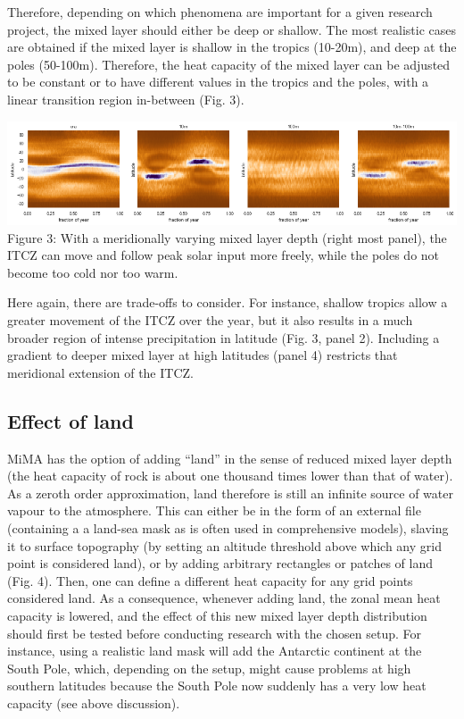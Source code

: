 Therefore, depending on which phenomena are important for a given
research project, the mixed layer should either be deep or shallow. The
most realistic cases are obtained if the mixed layer is shallow in the
tropics (10-20m), and deep at the poles (50-100m). Therefore, the heat
capacity of the mixed layer can be adjusted to be constant or to have
different values in the tropics and the poles, with a linear transition
region in-between (Fig. 3).

\includegraphics{itcz.png}\\
Figure 3: With a meridionally varying mixed layer depth (right most
panel), the ITCZ can move and follow peak solar input more freely, while
the poles do not become too cold nor too warm.

Here again, there are trade-offs to consider. For instance, shallow
tropics allow a greater movement of the ITCZ over the year, but it also
results in a much broader region of intense precipitation in latitude
(Fig. 3, panel 2). Including a gradient to deeper mixed layer at high
latitudes (panel 4) restricts that meridional extension of the ITCZ.

\subsection{Effect of land}\label{effect-of-land}

MiMA has the option of adding ``land'' in the sense of reduced mixed
layer depth (the heat capacity of rock is about one thousand times lower
than that of water). As a zeroth order approximation, land therefore is
still an infinite source of water vapour to the atmosphere. This can
either be in the form of an external file (containing a a land-sea mask
as is often used in comprehensive models), slaving it to surface
topography (by setting an altitude threshold above which any grid point
is considered land), or by adding arbitrary rectangles or patches of
land (Fig. 4). Then, one can define a different heat capacity for any
grid points considered land. As a consequence, whenever adding land, the
zonal mean heat capacity is lowered, and the effect of this new mixed
layer depth distribution should first be tested before conducting
research with the chosen setup. For instance, using a realistic land
mask will add the Antarctic continent at the South Pole, which,
depending on the setup, might cause problems at high southern latitudes
because the South Pole now suddenly has a very low heat capacity (see
above discussion).

